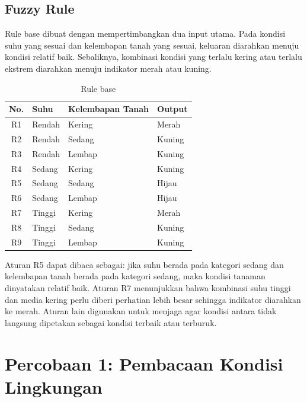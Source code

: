 \documentclass[12pt,a4paper]{article}
\begin{document}
\subsection{Fuzzy Rule}

Rule base dibuat dengan mempertimbangkan dua input utama. Pada kondisi suhu yang sesuai dan kelembapan tanah yang sesuai, keluaran diarahkan menuju kondisi relatif baik. Sebaliknya, kombinasi kondisi yang terlalu kering atau terlalu ekstrem diarahkan menuju indikator merah atau kuning.

\begin{table}[H]
    \centering
    \caption{Rule base}
    \label{tab:rulebase}
    \small
    \begin{tabularx}{\textwidth}{c L L L}
        \toprule
        \textbf{No.} & \textbf{Suhu} & \textbf{Kelembapan Tanah} & \textbf{Output} \\
        \midrule
        R1 & Rendah & Kering & Merah \\
        R2 & Rendah & Sedang & Kuning \\
        R3 & Rendah & Lembap & Kuning \\
        R4 & Sedang & Kering & Kuning \\
        R5 & Sedang & Sedang & Hijau \\
        R6 & Sedang & Lembap & Hijau \\
        R7 & Tinggi & Kering & Merah \\
        R8 & Tinggi & Sedang & Kuning \\
        R9 & Tinggi & Lembap & Kuning \\
        \bottomrule
    \end{tabularx}
\end{table}

Aturan R5 dapat dibaca sebagai: jika suhu berada pada kategori sedang dan kelembapan tanah berada pada kategori sedang, maka kondisi tanaman dinyatakan relatif baik. Aturan R7 menunjukkan bahwa kombinasi suhu tinggi dan media kering perlu diberi perhatian lebih besar sehingga indikator diarahkan ke merah. Aturan lain digunakan untuk menjaga agar kondisi antara tidak langsung dipetakan sebagai kondisi terbaik atau terburuk.
\section{Percobaan 1: Pembacaan Kondisi Lingkungan}
\end{document}
